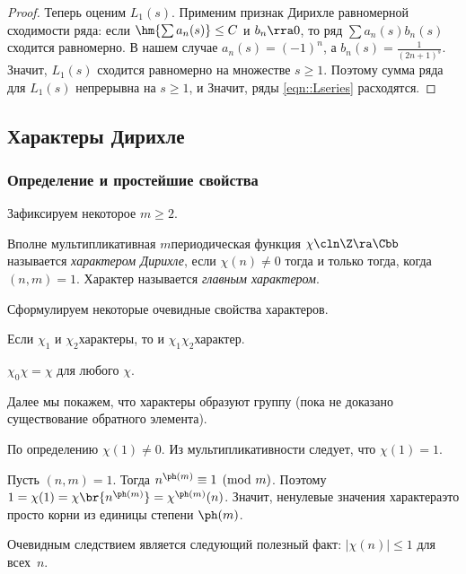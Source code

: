\documentclass[a4paper]{article}
\begin{document}
\begin{proof}
Теперь оценим $L_1(s)$. Применим признак Дирихле равномерной сходимости ряда:
если $\hm{\sum a_n(s)}\le C$ и $b_n\rra0$, то ряд $\sum a_n(s)b_n(s)$ сходится равномерно.
В нашем случае $a_n(s)=(-1)^n$, а $b_n(s)=\frac1{(2n+1)^s}$. Значит, $L_1(s)$ сходится равномерно на
множестве $s\ge1$. Поэтому сумма ряда для $L_1(s)$ непрерывна на $s\ge1$, и
Значит, ряды \eqref{eqn::Lseries} расходятся.
\end{proof}

\subsection{Характеры Дирихле}

\subsubsection{Определение и простейшие свойства}

Зафиксируем некоторое $m\ge2$.

\begin{df}
Вполне мультипликативная $m$\д периодическая функция $\chi\cln\Z\ra\Cbb$ называется \emph{характером Дирихле}, если
$\chi(n)\neq 0$ тогда и только тогда, когда $(n,m)=1$.
Характер
называется \emph{главным характером}.
\end{df}

Сформулируем некоторые очевидные свойства характеров.

 Если $\chi_1$ и $\chi_2$\т характеры, то и $\chi_1\chi_2$\т характер.

 $\chi_0\chi=\chi$ для любого $\chi$.

Далее мы покажем, что характеры образуют группу (пока не доказано существование обратного элемента).

 По определению $\chi(1)\neq0$. Из мультипликативности следует, что $\chi(1)=1$.

 Пусть $(n,m)=1$. Тогда $n^{\ph(m)}\equiv1\pmod{m}$. Поэтому $1=\chi(1)=\chi\br{n^{\ph(m)}}=\chi^{\ph(m)}(n)$.
Значит, ненулевые значения характера\т это просто корни из единицы степени $\ph(m)$.

 Очевидным следствием  является следующий полезный факт: $|\chi(n)|\le 1$ для всех~$n$.
\end{document}
